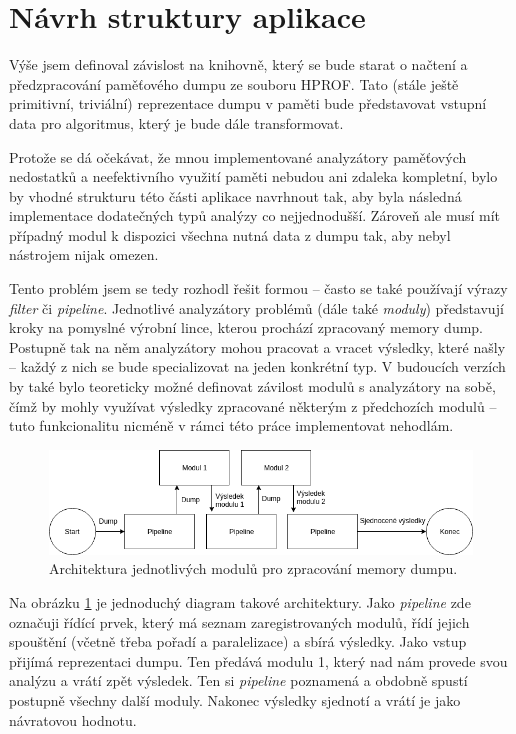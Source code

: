 \section{Návrh struktury aplikace}
\label{app-structure}
Výše jsem definoval závislost na knihovně, který se bude starat o načtení a předzpracování paměťového dumpu ze souboru HPROF. Tato (stále ještě primitivní, triviální) reprezentace dumpu v paměti bude představovat vstupní data pro algoritmus, který je bude dále transformovat.

Protože se dá očekávat, že mnou implementované analyzátory paměťových nedostatků a neefektivního využití paměti nebudou ani zdaleka kompletní, bylo by vhodné strukturu této části aplikace navrhnout tak, aby byla následná implementace dodatečných typů analýzy co nejjednodušší. Zároveň ale musí mít případný modul k dispozici všechna nutná data z dumpu tak, aby nebyl nástrojem nijak omezen.

Tento problém jsem se tedy rozhodl řešit formou  -- často se také používají výrazy \textit{filter} či \textit{pipeline}. Jednotlivé analyzátory problémů (dále také \textit{moduly}) představují kroky na pomyslné výrobní lince, kterou prochází zpracovaný memory dump. Postupně tak na něm analyzátory mohou pracovat a vracet výsledky, které našly -- každý z nich se bude specializovat na jeden konkrétní typ. V budoucích verzích by také bylo teoreticky možné definovat závilost modulů s analyzátory na sobě, čímž by mohly využívat výsledky zpracované některým z předchozích modulů -- tuto funkcionalitu nicméně v rámci této práce implementovat nehodlám.

\begin{figure}[ht!]
	\centering
	\includegraphics[scale=0.55]{obrazky/pipeline.png}
	\caption{Architektura jednotlivých modulů pro zpracování memory dumpu.}
	\label{obr-pipeline}
\end{figure}

Na obrázku \ref{obr-pipeline} je jednoduchý diagram takové architektury. Jako \textit{pipeline} zde označuji řídící prvek, který má seznam zaregistrovaných modulů, řídí jejich spouštění (včetně třeba pořadí a paralelizace) a sbírá výsledky. Jako vstup přijímá reprezentaci dumpu. Ten předává modulu 1, který nad nám provede svou analýzu a vrátí zpět výsledek. Ten si \textit{pipeline} poznamená a obdobně spustí postupně všechny další moduly. Nakonec výsledky sjednotí a vrátí je jako návratovou hodnotu.

